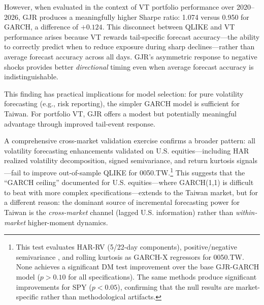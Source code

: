 However, when evaluated in the context of VT portfolio performance over 2020--2026, GJR produces a meaningfully higher Sharpe ratio: 1.074 versus 0.950 for GARCH, a difference of $+0.124$. This disconnect between QLIKE and VT performance arises because VT rewards tail-specific forecast accuracy---the ability to correctly predict when to reduce exposure during sharp declines---rather than average forecast accuracy across all days. GJR's asymmetric response to negative shocks provides better \textit{directional} timing even when average forecast accuracy is indistinguishable.

This finding has practical implications for model selection: for pure volatility forecasting (e.g., risk reporting), the simpler GARCH model is sufficient for Taiwan. For portfolio VT, GJR offers a modest but potentially meaningful advantage through improved tail-event response.

A comprehensive cross-market validation exercise confirms a broader pattern: all volatility forecasting enhancements validated on U.S. equities---including HAR realized volatility decomposition, signed semivariance, and return kurtosis signals---fail to improve out-of-sample QLIKE for 0050.TW.\footnote{This test evaluates HAR-RV \citep{corsi2009} (5/22-day components), positive/negative semivariance \citep{barndorff2010}, and rolling kurtosis as GARCH-X regressors for 0050.TW. None achieves a significant DM test improvement over the base GJR-GARCH model ($p > 0.10$ for all specifications). The same methods produce significant improvements for SPY ($p < 0.05$), confirming that the null results are market-specific rather than methodological artifacts.} This suggests that the ``GARCH ceiling'' documented for U.S. equities---where GARCH(1,1) is difficult to beat with more complex specifications---extends to the Taiwan market, but for a different reason: the dominant source of incremental forecasting power for Taiwan is the \textit{cross-market} channel (lagged U.S. information) rather than \textit{within-market} higher-moment dynamics.

